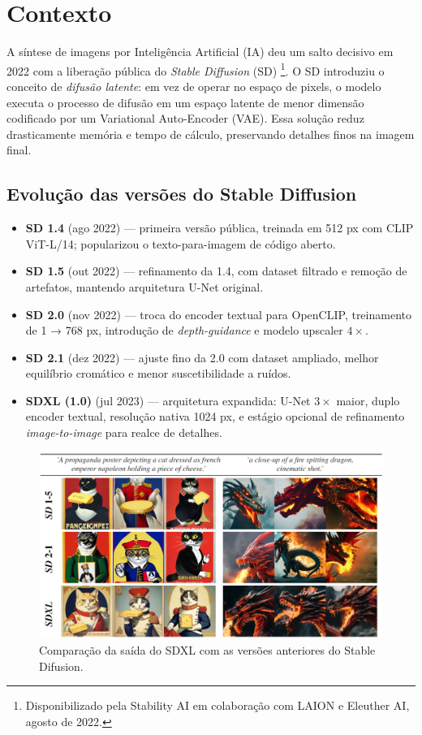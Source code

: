 \documentclass[12pt, %
openright, 
oneside, %
a4paper,    %
brazil]{facom-ufu-abntex2}
\begin{document}
\section{Contexto}

A síntese de imagens por Inteligência Artificial (IA) deu um salto decisivo em 2022 com a liberação pública do \textit{Stable Diffusion} (SD) \cite{rombach2022highresolutionimagesynthesislatent}\footnote{Disponibilizado pela Stability AI em colaboração com LAION e Eleuther AI, agosto de 2022.}. O SD introduziu o conceito de \emph{difusão latente}: em vez de operar no espaço de pixels, o modelo executa o processo de difusão em um espaço latente de menor dimensão codificado por um Variational Auto-Encoder (VAE). Essa solução reduz drasticamente memória e tempo de cálculo, preservando detalhes finos na imagem final.

\subsection*{Evolução das versões do Stable Diffusion}

\begin{itemize}
  \item \textbf{SD 1.4} (ago 2022) — primeira versão pública, treinada em 512 px com CLIP ViT-L/14; popularizou o texto-para-imagem de código aberto.  
  \item \textbf{SD 1.5} (out 2022) — refinamento da 1.4, com dataset filtrado e remoção de artefatos, mantendo arquitetura U-Net original.  
  \item \textbf{SD 2.0} (nov 2022) — troca do encoder textual para OpenCLIP, treinamento de 1 → 768 px, introdução de \emph{depth-guidance} e modelo upscaler \(4\times\).  
  \item \textbf{SD 2.1} (dez 2022) — ajuste fino da 2.0 com dataset ampliado, melhor equilíbrio cromático e menor suscetibilidade a ruídos.  
  \item \textbf{SDXL (1.0)} (jul 2023) — arquitetura expandida: U-Net \(3\times\) maior, duplo encoder textual, resolução nativa 1024 px, e estágio opcional de refinamento \emph{image-to-image} para realce de detalhes. \cite{podell2023sdxlimprovinglatentdiffusion}
\end{itemize}

\begin{figure}[H]
    \centering
	\includegraphics[width=0.85\linewidth]{figuras/comparison-sd-1.png}
	\caption[Comparação de versões do Stable Difusion]{Comparação da saída do SDXL com as versões anteriores do Stable Difusion.}
	\label{fig:comparisonSd1}
\end{figure}
\end{document}
